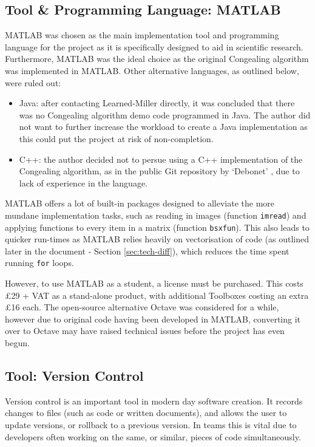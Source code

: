 \subsection{Tool \& Programming Language: MATLAB}
\label{ssec:matlab}

MATLAB \cite{MATLAB:2016} was chosen as the main implementation tool and programming language for the project as it is specifically designed to aid in scientific research. Furthermore, MATLAB was the ideal choice as the original \Gls{Congealing} algorithm was implemented in MATLAB. Other alternative languages, as outlined below, were ruled out:

\begin{itemize}
  \item Java: after contacting Learned-Miller directly, it was concluded that there was no \Gls{Congealing} algorithm demo code programmed in Java. The author did not want to further increase the workload to create a Java implementation as this could put the project at risk of non-completion.
  \item C++: the author decided not to persue using a C++ implementation of the \Gls{Congealing} algorithm, as in the public Git repository by `Debonet' \cite{cpp_congealing}, due to lack of experience in the language.
\end{itemize}

MATLAB offers a lot of built-in packages designed to alleviate the more mundane implementation tasks, such as reading in images (function \texttt{imread}) and applying functions to every item in a matrix (function \texttt{bsxfun}). This also leads to quicker run-times as MATLAB relies heavily on vectorisation of code (as outlined later in the document - Section \ref{sec:tech-diff}), which reduces the time spent running \texttt{for} loops.

However, to use MATLAB as a student, a license must be purchased. This costs \pounds29 + VAT as a stand-alone product, with additional Toolboxes costing an extra \pounds16 each. The open-source alternative Octave \cite{octave} was considered for a while, however due to original code having been developed in MATLAB, converting it over to Octave may have raised technical issues before the project has even begun.

\subsection{Tool: Version Control}

Version control is an important tool in modern day software creation. It records changes to files (such as code or written documents), and allows the user to update versions, or rollback to a previous version. In teams this is vital due to developers often working on the same, or similar, pieces of code simultaneously.

